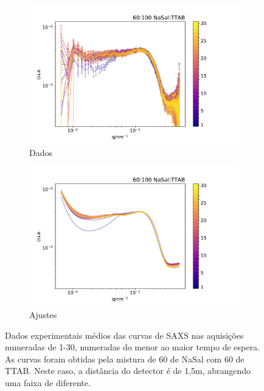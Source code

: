 	\begin{figure}[h]
		\begin{subfigure}[t]{0.5\textwidth}
			\centering
			\includegraphics[width=\textwidth]{imagens/saxs/TR_saxs_60_100_15_dados.pdf}
			\caption{Dados}
			\label{fig:saxs_tr_60_15_d}
		\end{subfigure}%
		\begin{subfigure}[t]{0.5\textwidth}
			\centering
			\includegraphics[width=\textwidth]{imagens/saxs/TR_saxs_60_100_15_ajustes.pdf}
			\caption{Ajustes}
			\label{fig:saxs_tr_60_15_a}
		\end{subfigure}
		\caption{Dados experimentais médios das curvas de SAXS nas aquisições numeradas de 1-30, numeradas do menor ao maior tempo de espera. As curvas foram obtidas pela mistura de 60 \mM{} de NaSal com 60 \mM{} de TTAB. Neste caso, a distância do detector é de 1,5m, abrangendo uma faixa de \q{} diferente.}
		\label{fig:saxs_tr_60_15}
	\end{figure} 
	
